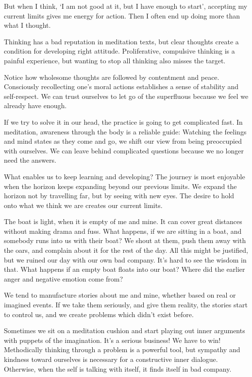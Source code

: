 
But when I think, `I am not good at it, but I have enough to start',
accepting my current limits gives me energy for action. Then I often end
up doing more than what I thought.

Thinking has a bad reputation in meditation texts, but clear thoughts
create a condition for developing right attitude. Proliferative,
compulsive thinking is a painful experience, but wanting to stop all
thinking also misses the target.

Notice how wholesome thoughts are followed by contentment and peace.
Consciously recollecting one's moral actions establishes a sense of
stability and self-respect. We can trust ourselves to let go of the
superfluous because we feel we already have enough.

If we try to solve it in our head, the practice is going to get
complicated fast. In meditation, awareness through the body is a
reliable guide: Watching the feelings and mind states as they come and
go, we shift our view from being preoccupied with ourselves. We can
leave behind complicated questions because we no longer need the
answers.


What enables us to keep learning and developing? The journey is most
enjoyable when the horizon keeps expanding beyond our previous limits.
We expand the horizon not by travelling far, but by seeing with new
eyes. The desire to hold onto what we think we are creates our current
limits.

The boat is light, when it is empty of me and mine. It can cover great
distances without making drama and fuss. What happens, if we are sitting
in a boat, and somebody runs into us with their boat? We shout at them,
push them away with the oars, and complain about it for the rest of the
day. All this might be justified, but we ruined our day with our own bad
company. It's hard to see the wisdom in that. What happens if an empty
boat floats into our boat? Where did the earlier anger and negative
emotion come from?

We tend to manufacture stories about me and mine, whether based on real
or imagined events. If we take them seriously, and give them reality,
the stories start to control us, and we create problems which didn't
exist before.

\enlargethispage*{\baselineskip}

Sometimes we sit on a meditation cushion and start playing out inner
arguments with puppets of the imagination. It's a serious business! We
have to win! Methodically thinking through a problem is a powerful tool,
but sympathy and kindness toward ourselves is necessary for a
constructive inner dialogue. Otherwise, when the self is talking with
itself, it finds itself in bad company.

